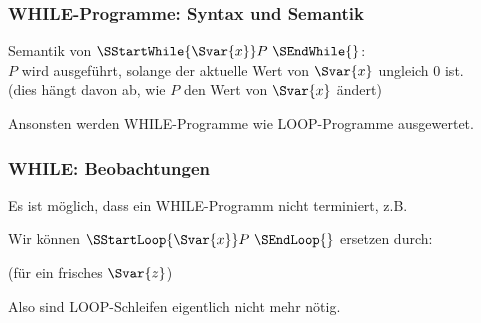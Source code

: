 \documentclass[aspectratio=1610,onlymath]{beamer}
\begin{document}
\begin{frame}\frametitle{WHILE-Programme: Syntax und Semantik}

\bigskip\pause

Semantik von $\SStartWhile{\Svar{x}}P~\SEndWhile{}$:\\
$P$ wird ausgeführt, solange der aktuelle Wert von $\Svar{x}$ ungleich $0$ ist.\\
\textcolor{devilscss}{(dies hängt davon ab, wie $P$ den Wert von $\Svar{x}$ ändert)}
\medskip

Ansonsten werden WHILE-Programme wie LOOP-Programme ausgewertet.

\end{frame}

\begin{frame}\frametitle{WHILE: Beobachtungen}

Es ist möglich, dass ein WHILE-Programm nicht terminiert, z.B.\medskip

\bigskip
\pause

Wir können $\SStartLoop{\Svar{x}}P~\SEndLoop{}$
ersetzen durch:\medskip


(für ein frisches $\Svar{z}$)\bigskip

Also sind LOOP-Schleifen eigentlich nicht mehr nötig.

\end{frame}
\end{document}
